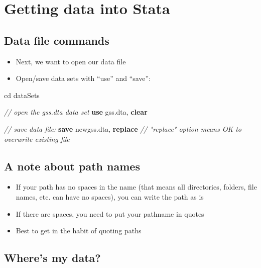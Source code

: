 \documentclass[]{book}
\newenvironment{Shaded}{\begin{snugshade}}{\end{snugshade}}
\newcommand{\CommentTok}[1]{\textcolor[rgb]{0.56,0.35,0.01}{\textit{#1}}}
\newcommand{\KeywordTok}[1]{\textcolor[rgb]{0.13,0.29,0.53}{\textbf{#1}}}
\newcommand{\NormalTok}[1]{#1}
\providecommand{\tightlist}{%
  \setlength{\itemsep}{0pt}\setlength{\parskip}{0pt}}
\begin{document}
\hypertarget{getting-data-into-stata}{%
\section{Getting data into Stata}\label{getting-data-into-stata}}

\hypertarget{data-file-commands}{%
\subsection{Data file commands}\label{data-file-commands}}

\begin{itemize}
\tightlist
\item
  Next, we want to open our data file
\item
  Open/save data sets with ``use'' and ``save'':
\end{itemize}

\begin{Shaded}
\begin{Highlighting}[]
\NormalTok{cd dataSets}

\CommentTok{// open the gss.dta data set}
\KeywordTok{use}\NormalTok{ gss.dta, }\KeywordTok{clear}

\CommentTok{// save data file:}
\KeywordTok{save}\NormalTok{ newgss.dta, }\KeywordTok{replace} \CommentTok{// "replace" option means OK to overwrite existing file}
\end{Highlighting}
\end{Shaded}

\hypertarget{a-note-about-path-names}{%
\subsection{A note about path names}\label{a-note-about-path-names}}

\begin{itemize}
\tightlist
\item
  If your path has no spaces in the name (that means all directories, folders, file names, etc. can have no spaces), you can write the path as is
\item
  If there are spaces, you need to put your pathname in quotes
\item
  Best to get in the habit of quoting paths
\end{itemize}

\hypertarget{wheres-my-data}{%
\subsection{Where's my data?}\label{wheres-my-data}}
\end{document}
